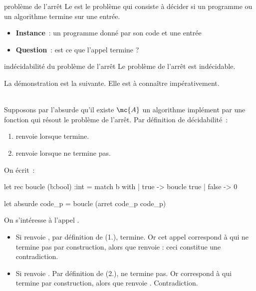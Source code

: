 \begin{adjustwidth}{-3cm}{-3cm}
\begin{definition}{}{problème de l'arrêt}
    Le  est le problème qui consiste à décider si un programme ou un algorithme termine sur une entrée.
    \begin{itemize}
        \item \textbf{Instance}~: un programme  donné par son code  et une entrée 
        \item \textbf{Question}~: est ce que l'appel  termine ?
    \end{itemize}
\end{definition}

\begin{theoreme}{}{indécidabilité du problème de l'arrêt}
    Le problème de l'arrêt est indécidable.
\end{theoreme}
La démonstration est la suivante. Elle est à connaître impérativement.\\\\
\begin{demonstration}
    Supposons par l'absurde qu'il existe $\mc{A}$ un algorithme implément par une fonction  qui résout le problème de l'arrêt. Par définition de décidabilité~:
    \begin{enumerate}
        \item {} renvoie  lorsque  termine.
        \item {} renvoie  lorsque  ne termine pas.
    \end{enumerate}
    On écrit~:
    \begin{lstOCaml}
        let rec boucle (b:bool) :int =
            match b with
            | true -> boucle true
            | false -> 0
    
        let absurde code_p = boucle (arret code_p code_p)
    \end{lstOCaml}
    
    On s'intéresse à l'appel .
    \begin{itemize}
        \item Si  renvoie , par définition de  (1.),  termine.
        Or cet appel  correspond à  qui ne termine pas par construction, alors que  renvoie  : ceci constitue une contradiction.
        \item Si  renvoie . Par définition de  (2.),  ne termine pas.
        Or  correspond à  qui termine par construction, alors que  renvoie . Contradiction.
    \end{itemize}
\end{demonstration}




\end{adjustwidth}
